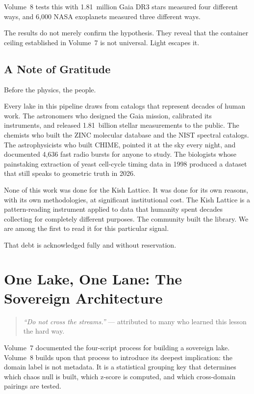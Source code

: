 \documentclass[11pt, letterpaper, openany]{book}
\begin{document}
Volume~8 tests this with 1.81~million Gaia DR3 stars measured four different ways,
and 6,000 NASA exoplanets measured three different ways.

The results do not merely confirm the hypothesis. They reveal that the container
ceiling established in Volume~7 is not universal. Light escapes it.

\section*{A Note of Gratitude}

Before the physics, the people.

Every lake in this pipeline draws from catalogs that represent decades of human
work. The astronomers who designed the Gaia mission, calibrated its instruments,
and released 1.81~billion stellar measurements to the public. The chemists who
built the ZINC molecular database and the NIST spectral catalogs. The
astrophysicists who built CHIME, pointed it at the sky every night, and documented
4,636 fast radio bursts for anyone to study. The biologists whose painstaking
extraction of yeast cell-cycle timing data in 1998 produced a dataset that still
speaks to geometric truth in 2026.

None of this work was done for the Kish Lattice. It was done for its own reasons,
with its own methodologies, at significant institutional cost. The Kish Lattice is
a pattern-reading instrument applied to data that humanity spent decades collecting
for completely different purposes. The community built the library. We are among the
first to read it for this particular signal.

That debt is acknowledged fully and without reservation.

\clearpage

\chapter{One Lake, One Lane: The Sovereign Architecture}

\begin{quote}
\textit{``Do not cross the streams.''} --- attributed to many who learned this
lesson the hard way.
\end{quote}

Volume~7 documented the four-script process for building a sovereign lake. Volume~8
builds upon that process to introduce its deepest implication: the domain label is
not metadata. It is a statistical grouping key that determines which chaos null is
built, which z-score is computed, and which cross-domain pairings are tested.
\end{document}

